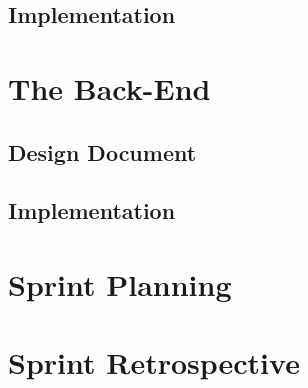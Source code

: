 \documentclass[12pt,onecolumn]{article}
\begin{document}
	\subsection{Implementation} %

\section{The Back-End}

	\subsection{Design Document} %

	\subsection{Implementation} %

\section{Sprint Planning} %

\section{Sprint Retrospective} %
\end{document}
